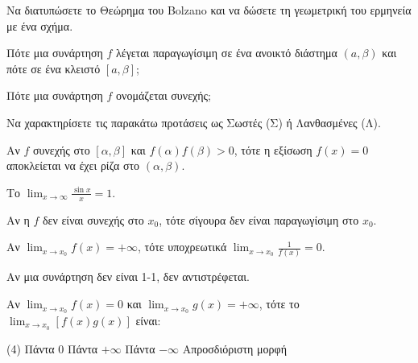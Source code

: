 \documentclass[11pt,a4paper]{article}
\newcommand{\kerkissans}[1]{{\fontfamily{maksf}\selectfont \textbf{#1}}}
\renewcommand{\textdexiakeraia}{}
\newcommand\themanum{A}
\newcounter{thema}[section]
\renewcommand{\thethema}{\arabic{thema}}
\newcommand{\Thema}{\refstepcounter{thema}{\textbf{\textcolor{black}{\faPenSquare\ \  \large \kerkissans{\textbf{\thethemaο\hspace{2mm}Θέμα}}}}}\hspace{0mm}}{}
\newenvironment{thema}[1]
{\begin{tcolorbox}[title=\Thema\kerkissans{\textbf{\large{  #1}}},breakable,
enhanced standard,titlerule=0pt,toprule=0pt, rightrule=0pt, bottomrule=0pt,
colback=white,left=0mm,top=1mm,bottom=0mm,
boxrule=0pt,
colframe=white,leftrule=0mm,sharp corners,coltitle=black]
\renewcommand{\themanum}{#1}}
{\end{tcolorbox}}
\begin{document}
\begin{thema}{A}
\begin{erwthma}
    \item Να διατυπώσετε το Θεώρημα του Bolzano και να δώσετε τη γεωμετρική του ερμηνεία με ένα σχήμα.
    \item Πότε μια συνάρτηση $f$ λέγεται παραγωγίσιμη σε ένα ανοικτό διάστημα $(a, \beta)$ και πότε σε ένα κλειστό $[a, \beta]$;
    \item Πότε μια συνάρτηση $f$ ονομάζεται συνεχής;
    \item Να χαρακτηρίσετε τις παρακάτω προτάσεις ως Σωστές (Σ) ή Λανθασμένες (Λ).
    \begin{alist}
        \item Αν $f$ συνεχής στο $[\alpha, \beta]$ και $f(\alpha)f(\beta)>0$, τότε η εξίσωση $f(x)=0$ αποκλείεται να έχει ρίζα στο $(\alpha, \beta)$.
        \item Το $\lim_{x\to \infty} \frac{\sin x}{x} = 1$.
        \item Αν η $f$ δεν είναι συνεχής στο $x_0$, τότε σίγουρα δεν είναι παραγωγίσιμη στο $x_0$.
        \item Αν $\lim_{x\to x_0} f(x) = +\infty$, τότε υποχρεωτικά $\lim_{x\to x_0} \frac{1}{f(x)} = 0$.
        \item Αν μια συνάρτηση δεν είναι 1-1, δεν αντιστρέφεται.
    \end{alist}
    \item Αν $\lim_{x\to x_0} f(x) = 0$ και $\lim_{x\to x_0} g(x) = +\infty$, τότε το $\lim_{x\to x_0} [f(x)g(x)]$ είναι:
    \begin{tasks}[label=\let\textdexiakeraia\relax\alph*.](4)
        \task Πάντα $0$
        \task Πάντα $+\infty$
        \task Πάντα $-\infty$
        \task Απροσδιόριστη μορφή
    \end{tasks}
\end{erwthma}
\end{thema}
\vspace{1cm}
\end{document}
